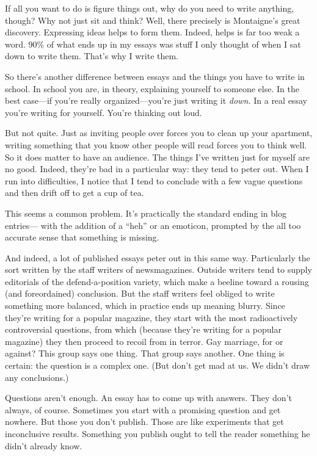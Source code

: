 If all you want to do is figure things out, why do you need to write
anything, though? Why not just sit and think? Well, there precisely is
Montaigne's great discovery. Expressing ideas helps to form them.
Indeed, helps is far too weak a word. 90\% of what ends up in my essays
was stuff I only thought of when I sat down to write them. That's why I
write them.

So there's another difference between essays and the things you have to
write in school. In school you are, in theory, explaining yourself to
someone else. In the best case---if you're really organized---you're
just writing it \emph{down.} In a real essay you're writing for
yourself. You're thinking out loud.

But not quite. Just as inviting people over forces you to clean up your
apartment, writing something that you know other people will read forces
you to think well. So it does matter to have an audience. The things
I've written just for myself are no good. Indeed, they're bad in a
particular way: they tend to peter out. When I run into difficulties, I
notice that I tend to conclude with a few vague questions and then drift
off to get a cup of tea.

This seems a common problem. It's practically the standard ending in
blog entries--- with the addition of a ``heh'' or an emoticon, prompted
by the all too accurate sense that something is missing.

And indeed, a lot of published essays peter out in this same way.
Particularly the sort written by the staff writers of newsmagazines.
Outside writers tend to supply editorials of the defend-a-position
variety, which make a beeline toward a rousing (and foreordained)
conclusion. But the staff writers feel obliged to write something more
balanced, which in practice ends up meaning blurry. Since they're
writing for a popular magazine, they start with the most radioactively
controversial questions, from which (because they're writing for a
popular magazine) they then proceed to recoil from in terror. Gay
marriage, for or against? This group says one thing. That group says
another. One thing is certain: the question is a complex one. (But don't
get mad at us. We didn't draw any conclusions.)

Questions aren't enough. An essay has to come up with answers. They
don't always, of course. Sometimes you start with a promising question
and get nowhere. But those you don't publish. Those are like experiments
that get inconclusive results. Something you publish ought to tell the
reader something he didn't already know.

